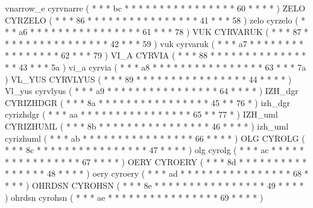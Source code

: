 \makecod vnarrow_e    cyrvnarre         ( *  *       *  bc  *  *  *  *     *  *  *  *  *     *  *  *  *     *  *  *     60  *  *    *  *   )
\makeCOD ZELO         CYRZELO           ( *  *       *  86  *  *  *  *     *  *  *  *  *     *  *  *  *     *  *  *     41  *  *    *  58  )
\makecod zelo         cyrzelo           ( *  *       *  a6  *  *  *  *     *  *  *  *  *     *  *  *  *     *  *  *     61  *  *    *  78  )
\makeCOD VUK          CYRVARUK          ( *  *       *  87  *  *  *  *     *  *  *  *  *     *  *  *  *     *  *  *     42  *  *    *  59  )
\makecod vuk          cyrvaruk          ( *  *       *  a7  *  *  *  *     *  *  *  *  *     *  *  *  *     *  *  *     62  *  *    *  79  )
\makeCOD VI_A         CYRVIA            ( *  *       *  88  *  *  *  *     *  *  *  *  *     *  *  *  *     *  *  *     43  *  *    *  5a  )
\makecod vi_a         cyrvia            ( *  *       *  a8  *  *  *  *     *  *  *  *  *     *  *  *  *     *  *  *     63  *  *    *  7a  )
\makeCOD VL_YUS       CYRVLYUS          ( *  *       *  89  *  *  *  *     *  *  *  *  *     *  *  *  *     *  *  *     44  *  *    *  *   )
\makecod Vl_yus       cyrvlyus          ( *  *       *  a9  *  *  *  *     *  *  *  *  *     *  *  *  *     *  *  *     64  *  *    *  *   )
\makeCOD IZH_dgr      CYRIZHDGR         ( *  *       *  8a  *  *  *  *     *  *  *  *  *     *  *  *  *     *  *  *     45  *  *    76 *   )
\makecod izh_dgr      cyrizhdgr         ( *  *       *  aa  *  *  *  *     *  *  *  *  *     *  *  *  *     *  *  *     65  *  *    77 *   )
\makeCOD IZH_uml      CYRIZHUML         ( *  *       *  8b  *  *  *  *     *  *  *  *  *     *  *  *  *     *  *  *     46  *  *    *  *   )
\makecod izh_uml      cyrizhuml         ( *  *       *  ab  *  *  *  *     *  *  *  *  *     *  *  *  *     *  *  *     66  *  *    *  *   )
\makeCOD OLG          CYROLG            ( *  *       *  8c  *  *  *  *     *  *  *  *  *     *  *  *  *     *  *  *     47  *  *    *  *   )
\makecod olg          cyrolg            ( *  *       *  ac  *  *  *  *     *  *  *  *  *     *  *  *  *     *  *  *     67  *  *    *  *   )
\makeCOD OERY         CYROERY           ( *  *       *  8d  *  *  *  *     *  *  *  *  *     *  *  *  *     *  *  *     48  *  *    *  *   )
\makecod oery         cyroery           ( *  *       *  ad  *  *  *  *     *  *  *  *  *     *  *  *  *     *  *  *     68  *  *    *  *   )
\makeCOD OHRDSN       CYROHSN           ( *  *       *  8e  *  *  *  *     *  *  *  *  *     *  *  *  *     *  *  *     49  *  *    *  *   )
\makecod ohrdsn       cyrohsn           ( *  *       *  ae  *  *  *  *     *  *  *  *  *     *  *  *  *     *  *  *     69  *  *    *  *   )
